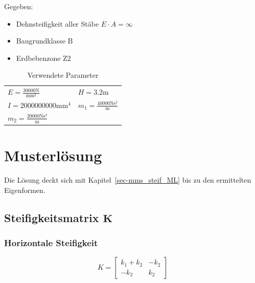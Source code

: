 \documentclass[
  letterpaper,
  DIV=11]{scrreprt}
\providecommand{\tightlist}{%
  \setlength{\itemsep}{0pt}\setlength{\parskip}{0pt}}\usepackage{longtable,booktabs,array}
\begin{document}
Gegeben:

\begin{itemize}
\tightlist
\item
  Dehnsteifigkeit aller Stäbe \(E\cdot A = \infty\)
\item
  Baugrundklasse B
\item
  Erdbebenzone Z2
\end{itemize}

\hypertarget{tbl-parameter_mms5}{}
\begin{longtable}[]{@{}
  >{\raggedright\arraybackslash}p{}
  >{\raggedright\arraybackslash}p{}@{}}
\caption{\label{tbl-parameter_mms5}Verwendete Parameter}\tabularnewline
\toprule\noalign{}
\endfirsthead
\endhead
\bottomrule\noalign{}
\endlastfoot
\(E = \frac{30000 \text{N}}{\text{mm}^{2}}\) & \(H = 3.2 \text{m}\) \\
\(I = 2000000000 \text{mm}^{4}\) &
\(m_{1} = \frac{40000 \text{N} \text{s}^{2}}{\text{m}}\) \\
\(m_{2} = \frac{20000 \text{N} \text{s}^{2}}{\text{m}}\) & \\
\end{longtable}

\newpage{}

\hypertarget{musterluxf6sung-11}{%
\section{Musterlösung}\label{musterluxf6sung-11}}

Die Lösung deckt sich mit Kapitel~\ref{sec-mms_steif_ML} bis zu den
ermittelten Eigenformen.

\hypertarget{steifigkeitsmatrix-mathbfk-1}{%
\subsection{\texorpdfstring{Steifigkeitsmatrix
\(\mathbf{K}\)}{Steifigkeitsmatrix \textbackslash mathbf\{K\}}}\label{steifigkeitsmatrix-mathbfk-1}}

\hypertarget{horizontale-steifigkeit-3}{%
\subsubsection{Horizontale
Steifigkeit}\label{horizontale-steifigkeit-3}}

\begin{equation}K = \left[\begin{matrix}k_{1} + k_{2} & - k_{2}\\- k_{2} & k_{2}\end{matrix}\right]\end{equation}
\end{document}
